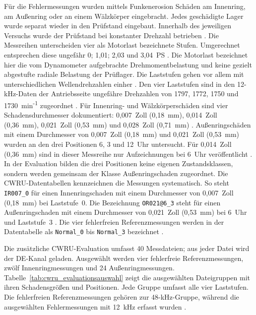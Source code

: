 Für die Fehlermessungen wurden mittels Funkenerosion Schäden am Innenring,
am Außenring oder an einem Wälzkörper eingebracht. Jedes geschädigte Lager
wurde separat wieder in den Prüfstand eingebaut. Innerhalb des jeweiligen
Versuchs wurde der Prüfstand bei konstanter Drehzahl betrieben
\cite[S.~102--103, Abschn.~3.1]{smithRollingElementBearing2015}.
Die Messreihen unterscheiden vier als Motorlast bezeichnete Stufen.
Umgerechnet entsprechen diese ungefähr 0; 1,01; 2,03 und 3,04~PS
\cite[S.~126, Tab.~A2]{smithRollingElementBearing2015}.
Die Motorlast bezeichnet hier die vom Dynamometer aufgebrachte
Drehmomentbelastung und keine gezielt abgestufte radiale Belastung der
Prüflager. Die Laststufen gehen vor allem mit unterschiedlichen
Wellendrehzahlen einher
\cite[S.~104, Abschn.~4]{smithRollingElementBearing2015}.
Den vier Laststufen sind in den 12-kHz-Daten der Antriebsseite ungefähre
Drehzahlen von 1797, 1772, 1750 und
1730~min\textsuperscript{-1} zugeordnet
\cite[S.~126, Tab.~A2]{smithRollingElementBearing2015}
\cite{12kDriveEnd}.
Für Innenring- und Wälzkörperschäden sind vier Schadensdurchmesser
dokumentiert: 0,007~Zoll (0,18~mm), 0,014~Zoll (0,36~mm),
0,021~Zoll (0,53~mm) und 0,028~Zoll (0,71~mm)
\cite[S.~126, Tab.~A2]{smithRollingElementBearing2015}
\cite{12kDriveEnd}.
Außenringschäden mit einem Durchmesser von 0,007~Zoll (0,18~mm) und
0,021~Zoll (0,53~mm) wurden an den drei Positionen 6, 3 und 12~Uhr
untersucht. Für 0,014~Zoll (0,36~mm) sind in dieser Messreihe nur
Aufzeichnungen bei 6~Uhr veröffentlicht
\cite[S.~126, Tab.~A2]{smithRollingElementBearing2015}
\cite{12kDriveEnd}.
In der Evaluation bilden die drei Positionen keine eigenen Zustandsklassen,
sondern werden gemeinsam der Klasse Außenringschaden zugeordnet.
Die CWRU-Datentabellen kennzeichnen die Messungen systematisch.
So steht \texttt{IR007\_0} für einen Innenringschaden mit einem Durchmesser
von 0,007~Zoll (0,18~mm) bei Laststufe~0. Die Bezeichnung
\texttt{OR021@6\_3} steht für einen Außenringschaden mit einem Durchmesser
von 0,021~Zoll (0,53~mm) bei 6~Uhr und Laststufe~3
\cite{12kDriveEnd}. Die vier fehlerfreien Referenzmessungen werden in der
Datentabelle als \texttt{Normal\_0} bis \texttt{Normal\_3} bezeichnet
\cite{NormalBaselineData}.

Die zusätzliche CWRU-Evaluation umfasst 40 Messdateien; aus jeder Datei wird
der DE-Kanal geladen. Ausgewählt werden vier fehlerfreie Referenzmessungen,
zwölf Innenringmessungen und 24 Außenringmessungen.
Tabelle~\ref{tab:cwru_evaluationsauswahl} zeigt die ausgewählten Dateigruppen
mit ihren Schadensgrößen und Positionen. Jede Gruppe umfasst alle vier
Laststufen. Die fehlerfreien Referenzmessungen gehören zur 48-kHz-Gruppe,
während die ausgewählten Fehlermessungen mit 12~kHz erfasst wurden
\cite[S.~103, Abschn.~3.2; S.~126, Tab.~A1--A2]
{smithRollingElementBearing2015}.

